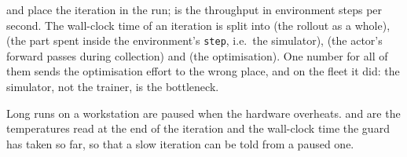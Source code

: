  and  place the iteration in the run;
 is the throughput in environment steps per second. The wall-clock
time of an iteration is split into  (the rollout as a
whole),  (the part spent inside the environment's
\texttt{step}, i.e.\ the simulator),  (the actor's forward
passes during collection) and  (the optimisation). One
number for all of them sends the optimisation effort to the wrong place, and
on the fleet it did: the simulator, not the trainer, is the bottleneck.

Long runs on a workstation are paused when the hardware overheats.
 and  are the temperatures read at the end of
the iteration and  the wall-clock time the guard has
taken so far, so that a slow iteration can be told from a paused one.

